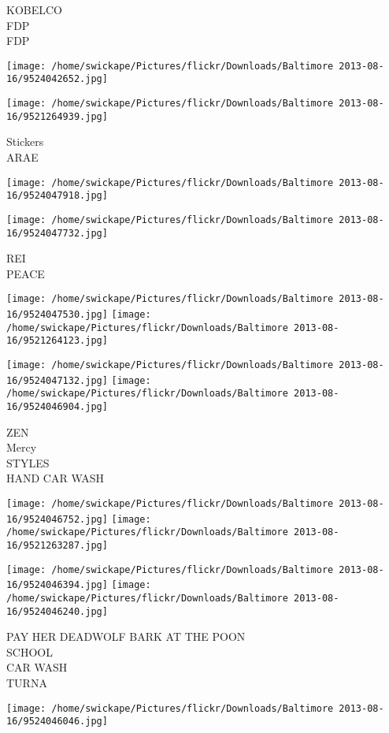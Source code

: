 \documentclass[10pt,letterpaper]{article}
\begin{document}
KOBELCO\\
FDP\\
FDP
\pagebreak

\texttt{[image: /home/swickape/Pictures/flickr/Downloads/Baltimore 2013-08-16/9524042652.jpg]}

\vspace{0.25in}
\texttt{[image: /home/swickape/Pictures/flickr/Downloads/Baltimore 2013-08-16/9521264939.jpg]}

Stickers\\
ARAE
\pagebreak

\texttt{[image: /home/swickape/Pictures/flickr/Downloads/Baltimore 2013-08-16/9524047918.jpg]}

\vspace{0.25in}
\texttt{[image: /home/swickape/Pictures/flickr/Downloads/Baltimore 2013-08-16/9524047732.jpg]}

REI\\
PEACE
\pagebreak

\texttt{[image: /home/swickape/Pictures/flickr/Downloads/Baltimore 2013-08-16/9524047530.jpg]}
\texttt{[image: /home/swickape/Pictures/flickr/Downloads/Baltimore 2013-08-16/9521264123.jpg]}

\texttt{[image: /home/swickape/Pictures/flickr/Downloads/Baltimore 2013-08-16/9524047132.jpg]}
\texttt{[image: /home/swickape/Pictures/flickr/Downloads/Baltimore 2013-08-16/9524046904.jpg]}

ZEN\\
Mercy\\
STYLES\\
HAND CAR WASH
\pagebreak

\texttt{[image: /home/swickape/Pictures/flickr/Downloads/Baltimore 2013-08-16/9524046752.jpg]}
\texttt{[image: /home/swickape/Pictures/flickr/Downloads/Baltimore 2013-08-16/9521263287.jpg]}

\texttt{[image: /home/swickape/Pictures/flickr/Downloads/Baltimore 2013-08-16/9524046394.jpg]}
\texttt{[image: /home/swickape/Pictures/flickr/Downloads/Baltimore 2013-08-16/9524046240.jpg]}

PAY HER DEADWOLF BARK AT THE POON\\
SCHOOL\\
CAR WASH\\
TURNA
\pagebreak

\texttt{[image: /home/swickape/Pictures/flickr/Downloads/Baltimore 2013-08-16/9524046046.jpg]}
\end{document}
